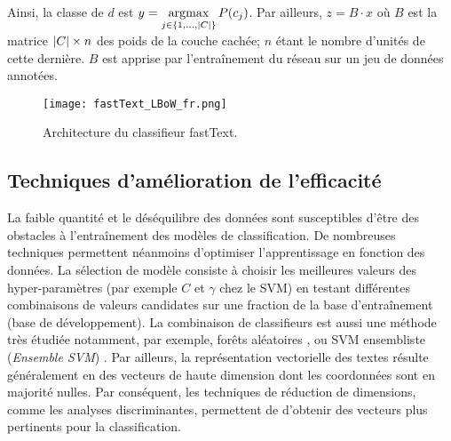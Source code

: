  Ainsi, la classe de $d$ est $y = \mathop{\mathrm{argmax}}\limits_{j \in \lbrace 1,...,{\vert C\vert} \rbrace} P(c_j)$. Par ailleurs, $z = B \cdot x$ où $B$ est la matrice ${\vert C\vert} \times n$ des poids de la couche cachée; $n$ étant le nombre d'unités de cette dernière. $B$ est apprise par l'entraînement du réseau sur un jeu de données annotées.
 
 \begin{figure}[!htb]
 	\centering
 	\texttt{[image: fastText\_LBoW\_fr.png]}
 	\caption{Architecture du classifieur fastText.}\label{fig:sensresultat:fastText}
 \end{figure}


\subsection{Techniques d'amélioration de l'efficacité}
La faible quantité \citep{ruparel2013smalldataclass} et le déséquilibre des données sont susceptibles d'être des obstacles à l'entraînement des modèles de classification. De nombreuses techniques permettent néanmoins d'optimiser l'apprentissage en fonction des données. La sélection de modèle consiste à choisir les meilleures valeurs des hyper-paramètres (par exemple $C$ et $\gamma$ chez le SVM) en testant différentes combinaisons de valeurs candidates sur une fraction de la base d'entraînement (base de développement). La combinaison de classifieurs est aussi une méthode très étudiée \citep{kittler1996combiningclassifiers,kuncheva2004combiningclassifiers, tulyakov2008combiningclassifiers} notamment, par exemple, forêts aléatoires \citep{breiman2001randomforest}, ou SVM ensembliste (\textit{Ensemble SVM}) \citep{dong2005ensembleSVM}.
Par ailleurs, la représentation vectorielle des textes résulte généralement en des vecteurs de haute dimension dont les coordonnées sont en majorité nulles. Par conséquent, les techniques de réduction de dimensions, comme les analyses discriminantes, permettent de d'obtenir des vecteurs plus pertinents pour la classification.

